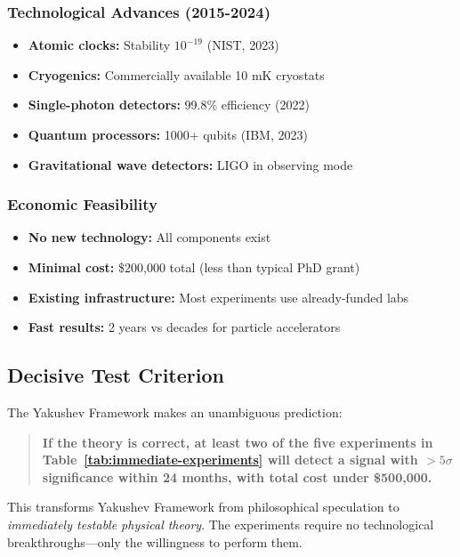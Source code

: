 \documentclass[11pt,a4paper]{article}
\begin{document}
	\subsubsection{Technological Advances (2015-2024)}
	
	\begin{itemize}
		\item \textbf{Atomic clocks:} Stability $10^{-19}$ (NIST, 2023)
		\item \textbf{Cryogenics:} Commercially available 10 mK cryostats
		\item \textbf{Single-photon detectors:} 99.8\% efficiency (2022)
		\item \textbf{Quantum processors:} 1000+ qubits (IBM, 2023)
		\item \textbf{Gravitational wave detectors:} LIGO in observing mode
	\end{itemize}
	
	\subsubsection{Economic Feasibility}
	
	\begin{itemize}
		\item \textbf{No new technology:} All components exist
		\item \textbf{Minimal cost:} \$200,000 total (less than typical PhD grant)
		\item \textbf{Existing infrastructure:} Most experiments use already-funded labs
		\item \textbf{Fast results:} 2 years vs decades for particle accelerators
	\end{itemize}
	
	\subsection{Decisive Test Criterion}
	
	The Yakushev Framework makes an unambiguous prediction:
	
	\begin{quote}
		\textbf{If the theory is correct, at least two of the five experiments in Table~\ref{tab:immediate-experiments} will detect a signal with $>5\sigma$ significance within 24 months, with total cost under \$500,000.}
	\end{quote}
	
	This transforms Yakushev Framework from philosophical speculation to \emph{immediately testable physical theory}. The experiments require no technological breakthroughs—only the willingness to perform them.
	
\end{document}
